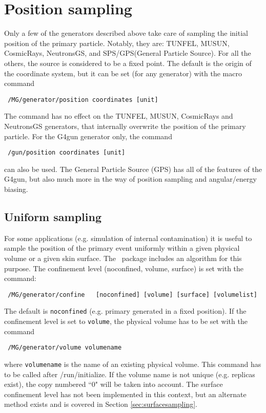 \section{Position sampling} \label{Section:positionsampling}
Only a few of the generators described above take care of sampling the initial position of 
the primary particle. Notably, they are: TUNFEL, MUSUN, CosmicRays, NeutronsGS,
and \hbox{SPS}/\hbox{GPS}(General Particle Source).
For 
all the others, the source is considered to be a fixed point.
The default is the origin of the coordinate system, but it can be set (for any generator) 
with the macro command
\begin{lstlisting} 
 /MG/generator/position coordinates [unit]
\end{lstlisting}
The command has no effect on the TUNFEL, MUSUN, CosmicRays and NeutronsGS generators, that 
internally overwrite the position of the primary particle. For the G4gun generator only, the 
command 
\begin{lstlisting} 
 /gun/position coordinates [unit]
\end{lstlisting}
can also be used.  The General Particle Source (GPS) has all of the features of
the G4gun, but also much more in the way of position sampling and angular/energy
biasing.\\
%
\subsection{Uniform sampling} 
For some applications (e.g. simulation of internal contamination) it 
is useful to sample the position of the primary event uniformly within a given 
physical volume or a given skin surface. 
The \mage \ package includes an algorithm for this purpose. 
The confinement level (noconfined, volume, surface) is set with the command: 
 
\begin{lstlisting}
 /MG/generator/confine   [noconfined] [volume] [surface] [volumelist]
\end{lstlisting}

The default is \texttt{noconfined} (e.g. primary generated in a fixed position). 
If the confinement level is set to \texttt{volume}, the physical volume 
has to be set with the command 
 
\begin{lstlisting}
 /MG/generator/volume volumename
\end{lstlisting}

\noindent where \texttt{volumename} is the name of an existing physical volume. This command has 
to be called after /run/initialize. If the volume name is not unique (e.g. replicas exist), 
the copy numbered ``0" will be taken into account.  The surface confinement
level has not been implemented in this context, but an alternate method exists
and is covered in Section \ref{sec:surfacesampling}. \\


